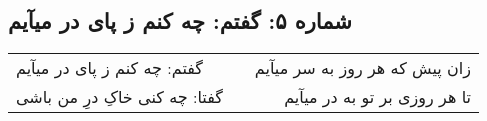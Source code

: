 \begin{center}
\section*{شماره ۵: گفتم: چه کنم ز پای در میآیم}
\label{sec:005}
\begin{longtable}{l p{0.5cm} r}
گفتم: چه کنم ز پای در میآیم
&&
زان پیش که هر روز به سر میآیم
\\
گفتا: چه کنی خاکِ درِ من باشی
&&
تا هر روزی بر تو به در میآیم
\\
\end{longtable}
\end{center}
